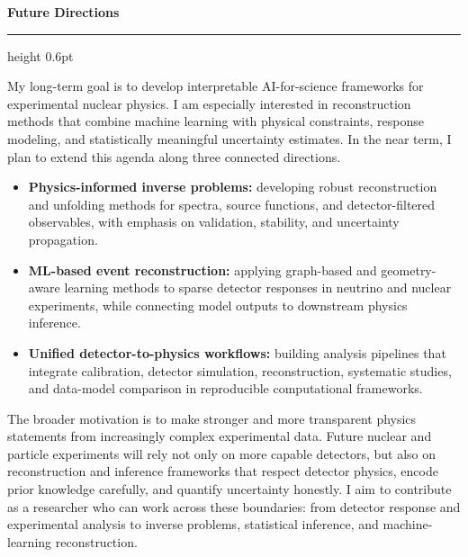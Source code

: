 \documentclass[10pt]{article}
\newcommand{\rssection}[1]{%
  \vspace{0.85em}
  {\large\bfseries\color{accent} #1}\par
  \vspace{0.2em}
  {\color{rule}\hrule height 0.6pt}
  \vspace{0.45em}
}
\newcommand{\bodypar}[1]{%
  {\normalsize #1\par}
  \vspace{0.58em}
}
\begin{document}
\rssection{Future Directions}
\bodypar{My long-term goal is to develop interpretable AI-for-science frameworks for experimental nuclear physics. I am especially interested in reconstruction methods that combine machine learning with physical constraints, response modeling, and statistically meaningful uncertainty estimates. In the near term, I plan to extend this agenda along three connected directions.}

\begin{itemize}[leftmargin=1.35em,itemsep=0.25em,topsep=0.1em]
  \item \textbf{Physics-informed inverse problems:} developing robust reconstruction and unfolding methods for spectra, source functions, and detector-filtered observables, with emphasis on validation, stability, and uncertainty propagation.
  \item \textbf{ML-based event reconstruction:} applying graph-based and geometry-aware learning methods to sparse detector responses in neutrino and nuclear experiments, while connecting model outputs to downstream physics inference.
  \item \textbf{Unified detector-to-physics workflows:} building analysis pipelines that integrate calibration, detector simulation, reconstruction, systematic studies, and data-model comparison in reproducible computational frameworks.
\end{itemize}

\vspace{0.45em}
\bodypar{The broader motivation is to make stronger and more transparent physics statements from increasingly complex experimental data. Future nuclear and particle experiments will rely not only on more capable detectors, but also on reconstruction and inference frameworks that respect detector physics, encode prior knowledge carefully, and quantify uncertainty honestly. I aim to contribute as a researcher who can work across these boundaries: from detector response and experimental analysis to inverse problems, statistical inference, and machine-learning reconstruction.}
\end{document}

